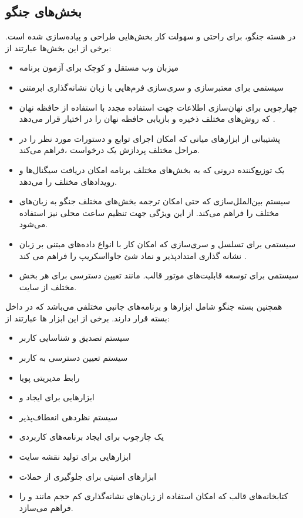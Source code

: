 {\subsection{بخش‌های جنگو}
در هسته جنگو، برای راحتی و سهولت کار بخش‌هایی طراحی و پیاده‌سازی شده است. برخی از 
این بخش‌ها عبارتند از:
\begin{itemize}
	\item میزبان وب مستقل و کوچک برای آزمون برنامه 
	\item سیستمی برای معتبرسازی و سری‌سازی فرم‌هایی با  زبان نشانه‌گذاری ابرمتنی
	\item چهارچوبی برای نهان‌سازی اطلاعات جهت استفاده مجدد با استفاده از حافظه نهان که روش‌های مختلف ذخیره و بازیابی حافظه نهان را در اختیار قرار می‌دهد .
	\item پشتیبانی از ابزارهای میانی که امکان اجرای توابع و دستورات مورد نظر را در مراحل مختلف پردازش یک درخواست ،فراهم می‌کند.
	\item یک توزیع‌کننده درونی که به بخش‌های مختلف برنامه امکان دریافت سیگنال‌ها و رویدادهای مختلف را می‌دهد.
	\item سیستم بین‌الملل‌سازی که حتی امکان ترجمه بخش‌های مختلف جنگو به زبان‌های مختلف را فراهم می‌کند. از این ویژگی جهت تنظیم ساعت محلی نیز استفاده می‌شود.
	\item  سیستمی برای تسلسل و سری‌سازی که امکان کار با انواع داده‌های مبتنی بر زبان نشانه گذاری امتدادپذیر و نماد شئ جاوااسکریپ را فراهم می کند .
	\item سیستمی برای توسعه قابلیت‌های موتور قالب. مانند تعیین دسترسی برای هر بخش مختلف از سایت.
\end{itemize}
 
همچنین بسته جنگو شامل ابزارها و برنامه‌های جانبی مختلفی می‌باشد که در داخل بسته  قرار دارند. برخی از این ابزار ها عبارتند از:
\begin{itemize}
	\item سیستم تصدیق و شناسایی کاربر
	\item سیستم تعیین دسترسی به کاربر
	\item رابط مدیریتی پویا
	\item ابزارهایی برای ایجاد  و 
	\item سیستم نظر‌دهی انعطاف‌پذیر
	\item یک چارچوب برای ایجاد برنامه‌های کاربردی 
	\item ابزارهایی برای تولید نقشه سایت
	\item ابزارهای امنیتی برای جلوگیری از حملات 
	\item کتابخانه‌های قالب که امکان استفاده از زبان‌های نشانه‌گذاری کم حجم مانند  و  را فراهم می‌سازد.
\end{itemize}
 
}
